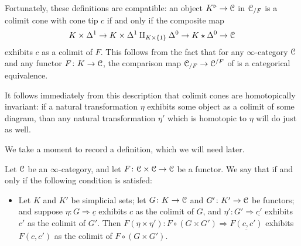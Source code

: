 \documentclass[main.tex]{subfiles}
\begin{document}
Fortunately, these definitions are compatible: an object $K^{\triangleright} \to \mathcal{C}$ in $\mathcal{C}_{/F}$ is a colimit cone with cone tip $c$ if and only if the composite map
\begin{equation}
  \label{eq:natural_transformation_from_colimit_cone}
  K \times \Delta^{1} \to K \times \Delta^{1} \amalg_{K \times \{1\}} \Delta^{0} \to K \star \Delta^{0} \to \mathcal{C}
\end{equation}
exhibits $c$ as a colimit of $F$. This follows from the fact that for any $\infty$-category $\mathcal{C}$ and any functor $F\colon K \to \mathcal{C}$, the comparison map $\mathcal{C}_{/F} \to \mathcal{C}^{/F}$ of \cite[Prop.~4.2.1.5]{highertopostheory} is a categorical equivalence.

\begin{note}
  It follows immediately from this description that colimit cones are homotopically invariant: if a natural transformation $\eta$ exhibits some object as a colimit of some diagram, than any natural transformation $\eta'$ which is homotopic to $\eta$ will do just as well.
\end{note}

We take a moment to record a definition, which we will need later.

\begin{definition}
  \label{def:preserve_colimits_in_each_slot}
  Let $\mathcal{C}$ be an $\infty$-category, and let $F\colon \mathcal{C} \times \mathcal{C} \to \mathcal{C}$ be a functor. We say that  if and only if the following condition is satisfed:
  \begin{itemize}
    \item Let $K$ and $K'$ be simplicial sets; let $G\colon K \to \mathcal{C}$ and $G'\colon K' \to \mathcal{C}$ be functors; and suppose $\eta\colon G \Rightarrow \underline{c}$ exhibits $c$ as the colimit of $G$, and $\eta'\colon G' \Rightarrow \underline{c'}$ exhibits $c'$ as the colimit of $G'$. Then $F(\eta \times \eta')\colon F \circ (G \times G') \Rightarrow \underline{F(c, c')}$ exhibits $F(c, c')$ as the colimit of $F \circ (G \times G')$.
  \end{itemize}
\end{definition}
\end{document}
